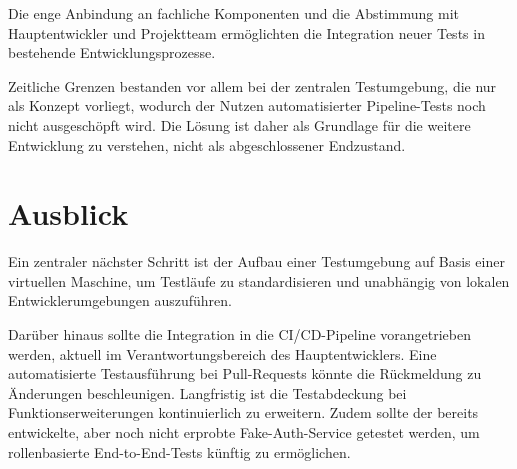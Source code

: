 Die enge Anbindung an fachliche Komponenten und die Abstimmung mit Hauptentwickler und Projektteam ermöglichten die Integration neuer Tests in bestehende Entwicklungsprozesse.

Zeitliche Grenzen bestanden vor allem bei der zentralen Testumgebung, die nur als Konzept vorliegt, wodurch der Nutzen automatisierter Pipeline-Tests noch nicht ausgeschöpft wird. Die Lösung ist daher als Grundlage für die weitere Entwicklung zu verstehen, nicht als abgeschlossener Endzustand.

\section{Ausblick}
Ein zentraler nächster Schritt ist der Aufbau einer Testumgebung auf Basis einer virtuellen Maschine, um Testläufe zu standardisieren und unabhängig von lokalen Entwicklerumgebungen auszuführen.

Darüber hinaus sollte die Integration in die CI/CD-Pipeline vorangetrieben werden, aktuell im Verantwortungsbereich des Hauptentwicklers. Eine automatisierte Testausführung bei Pull-Requests könnte die Rückmeldung zu Änderungen beschleunigen.
Langfristig ist die Testabdeckung bei Funktionserweiterungen kontinuierlich zu erweitern. Zudem sollte der bereits entwickelte, aber noch nicht erprobte Fake-Auth-Service getestet werden, um rollenbasierte End-to-End-Tests künftig zu ermöglichen.